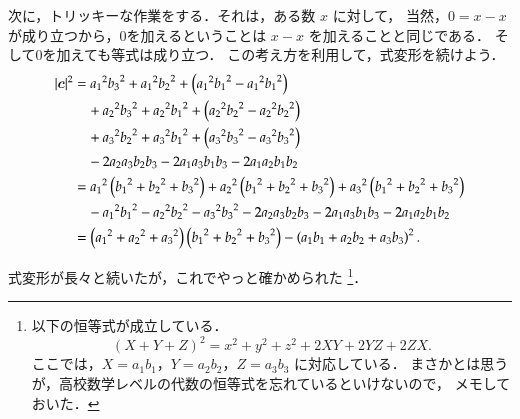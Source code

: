                 次に，トリッキーな作業をする．それは，ある数 $x$ に対して，
                当然，$0=x-x$ が成り立つから，0を加えるということは $x-x$ を加えることと同じである．
                そして0を加えても等式は成り立つ．
                この考え方を利用して，式変形を続けよう．
                    \begin{align*}
                        |\boldsymbol{c}|^{2}
                        &= {a_{1}}^{2}{b_{3}}^{2} + {a_{1}}^{2}{b_{2}}^{2}
                            + \left({a_{1}}^{2}{b_{1}}^{2} - {a_{1}}^{2}{b_{1}}^{2}\right) \\
                        &\quad + {a_{2}}^{2}{b_{3}}^{2} + {a_{2}}^{2}{b_{1}}^{2}
                            + \left({a_{2}}^{2}{b_{2}}^{2} - {a_{2}}^{2}{b_{2}}^{2}\right) \\
                        &\quad + {a_{3}}^{2}{b_{2}}^{2} + {a_{3}}^{2}{b_{1}}^{2}
                            + \left({a_{3}}^{2}{b_{3}}^{2} - {a_{3}}^{2}{b_{3}}^{2}\right) \\
                        &\quad - 2a_{2}a_{3}b_{2}b_{3} - 2a_{1}a_{3}b_{1}b_{3} - 2a_{1}a_{2}b_{1}b_{2} \\
                        &=   {a_{1}}^{2}\left({b_{1}}^{2} + {b_{2}}^{2} + {b_{3}}^{2}\right)
                           + {a_{2}}^{2}\left({b_{1}}^{2} + {b_{2}}^{2} + {b_{3}}^{2}\right)
                           + {a_{3}}^{2}\left({b_{1}}^{2} + {b_{2}}^{2} + {b_{3}}^{2}\right) \\
                        &\quad -{a_{1}}^{2}{b_{1}}^{2} - {a_{2}}^{2}{b_{2}}^{2} - {a_{3}}^{2}{b_{3}}^{2}
                               - 2a_{2}a_{3}b_{2}b_{3} - 2a_{1}a_{3}b_{1}b_{3} - 2a_{1}a_{2}b_{1}b_{2} \\
                        &=  \left( {a_{1}}^{2} + {a_{2}}^{2} + {a_{3}}^{2} \right)
                            \left( {b_{1}}^{2} + {b_{2}}^{2} + {b_{3}}^{2} \right)
                           -\left(a_{1}b_{1}+a_{2}b_{2}+a_{3}b_{3}\right)^{2}.
                    \end{align*}

                式変形が長々と続いたが，これでやっと確かめられた
                \footnote{
                    以下の恒等式が成立している．
                        \begin{equation*}
                            \left( X + Y + Z \right)^{2}
                            = {x}^{2} + {y}^{2} + {z}^{2} + 2XY + 2YZ + 2ZX.
                        \end{equation*}
                    ここでは，$X=a_{1}b_{1}$，$Y=a_{2}b_{2}$，$Z=a_{3}b_{3}$ に対応している．
                    まさかとは思うが，高校数学レベルの代数の恒等式を忘れているといけないので，
                    メモしておいた．
                }．

